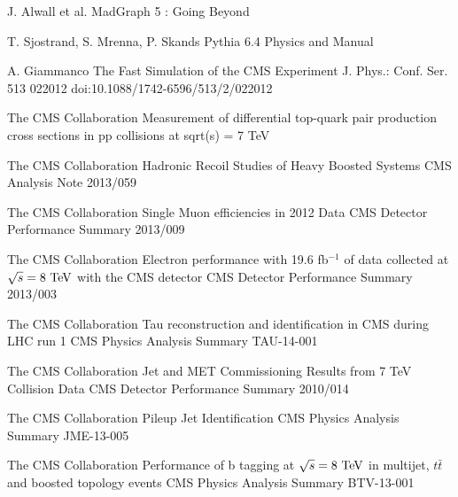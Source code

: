 \begin{thebibliography}{2}
             {J. Alwall et al.}
             {MadGraph 5 : Going Beyond}
             {}

             {T. Sjostrand, S. Mrenna, P. Skands}
             {Pythia 6.4 Physics and Manual}
             {}

             {A. Giammanco}
             {The Fast Simulation of the CMS Experiment}
             {J. Phys.: Conf. Ser. 513 022012 doi:10.1088/1742-6596/513/2/022012}

             {The CMS Collaboration}
             {Measurement of differential top-quark pair production
             cross sections in pp collisions at sqrt(s) = 7 TeV}
             {}

             {The CMS Collaboration}
             {Hadronic Recoil Studies of Heavy Boosted Systems}
             {CMS Analysis Note 2013/059}


             {The CMS Collaboration}
             {Single Muon efficiencies in 2012 Data}
             {CMS Detector Performance Summary 2013/009}

             {The CMS Collaboration}
             {Electron performance with 19.6 fb$^{-1}$ of data collected at $\sqrt{s}=8~\text{TeV}$ with the CMS detector}
             {CMS Detector Performance Summary 2013/003}

             {The CMS Collaboration}
             {Tau reconstruction and identification in CMS during LHC run 1}
             {CMS Physics Analysis Summary TAU-14-001}

             {The CMS Collaboration}
             {Jet and MET Commissioning Results from 7 TeV Collision Data}
             {CMS Detector Performance Summary 2010/014}

             {The CMS Collaboration}
             {Pileup Jet Identification}
             {CMS Physics Analysis Summary JME-13-005}

             {The CMS Collaboration}
             {Performance of b tagging at $\sqrt{s} = 8~\text{TeV}$ in multijet, $t\bar{t}$ and
             boosted topology events}
             {CMS Physics Analysis Summary BTV-13-001}


\end{thebibliography}
